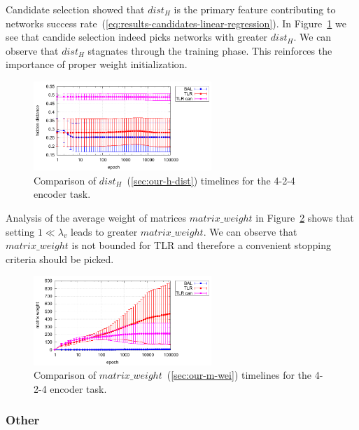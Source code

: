 Candidate selection showed that $dist_{H}$ is the primary feature contributing to networks success rate~(\ref{eq:results-candidates-linear-regression}). In Figure~\ref{fig:results-candidates-h-dist} we see that candide selection indeed picks networks with greater $dist_{H}$. We can observe that $dist_{H}$ stagnates through the training phase. This reinforces the importance of proper weight initialization. 

\begin{figure}[H]
  \centering
  \includegraphics[width=0.6\textwidth]{img/feature-cmp-h-dist.pdf}  
   \caption{Comparison of $dist_{H}$~(\ref{sec:our-h-dist}) timelines for the {4-2-4 encoder} task.}
  \label{fig:results-candidates-h-dist}
\end{figure}

Analysis of the average weight of matrices $matrix\_weight$ in Figure~\ref{fig:results-candidates-m-wei} shows that setting $1 \ll \lambda_v$ leads to greater $matrix\_weight$. We can observe that $matrix\_weight$ is not bounded for TLR and therefore a convenient stopping criteria should be picked. 

\begin{figure}[H]
  \centering
  \includegraphics[width=0.6\textwidth]{img/feature-cmp-m-wei.pdf}  
   \caption{Comparison of $matrix\_weight$~(\ref{sec:our-m-wei}) timelines for the {4-2-4 encoder} task.}
  \label{fig:results-candidates-m-wei}
\end{figure}


\subsubsection{Other}

